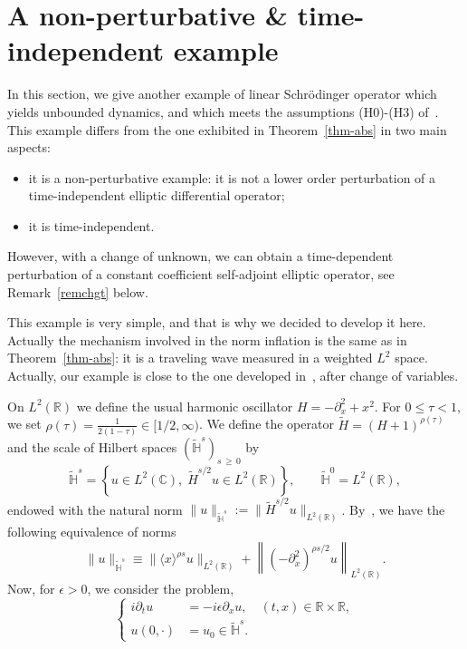 \documentclass[10pt]{amsart}
\theoremstyle{definition}\newtheorem{defi}[theo]{Definition}\newtheorem{rema}[theo]{Remark}\newtheorem{exam}[theo]{Example}\newtheorem{exem}[theo]{Example}\newtheorem{nota}[theo]{Notation}
\newcommand{\C}{\mathbb{C}}
\newcommand{\R}{\mathbb{R}}
\newcommand{\HH}{\mathbb{H}}
\newcommand*\eps{\epsilon}
\newcommand{\wt}{\widetilde}
\newcommand{\<}{\langle}
\renewcommand{\>}{\rangle}
\begin{document}
\appendix
\section{A non-perturbative \& time-independent example}\label{appendixA}

In this section, we give another example of linear Schr\"odinger operator which yields unbounded dynamics, and which meets the assumptions (H0)-(H3) of~\cite{MasRo}. This example differs from the one exhibited in Theorem~\ref{thm-abs} in two main aspects:
\begin{itemize}
\item it is a non-perturbative example: it is not a lower order perturbation of a time-independent elliptic differential operator;
\item it is time-independent.
\end{itemize}

However, with a change of unknown, we can obtain a time-dependent perturbation of a constant coefficient self-adjoint elliptic operator, see Remark~\ref{remchgt} below.

This example is very simple, and that is why we decided to develop it here. Actually the mechanism involved in the norm inflation is the same as in Theorem~\ref{thm-abs}: it is a traveling wave measured in a weighted $L^2$ space. Actually, our example is close to the one developed in~\cite[Appendix A]{BGMR2}, after change of variables.


On $L^2(\R)$ we define the usual harmonic oscillator $H=-\partial^2_x +x^2$. For $0\leq \tau <1$, we set $\rho(\tau)=\frac1{2(1-\tau)} \in [1/2,\infty)$. We define the operator $\wt{H}=(H+1)^{\rho(\tau)}$ and the scale of Hilbert spaces $(\widetilde{\HH}^{s})_{s\,\geq\,0}$ by
\[
\widetilde{\HH}^{s} = \left\{ u\in L^2(\C),\; \wt{H}^{s/2}u\in L^2(\R)\right\}, \qquad \widetilde{\HH}^{0} =L^2(\R),
\]
endowed with the natural norm $\|u\|_{\widetilde{\HH}^{s}} := \|
\wt{H}^{s/2}u \|_{L^2(\R)} $. By~\cite[Lemma~2.4]{YajimaZhang2}, we have the following equivalence of norms
\begin{equation}\label{equiv}
\|u\|_{\widetilde{\HH}^{s}} \equiv \|\<x\>^{\rho s}u\|_{L^2(\R)}+\left\|\left(-\partial^2_x\right)^{\rho s/2}u\right\|_{L^2(\R)}.
\end{equation}
Now, for $\eps>0$, we consider the problem,
\begin{equation}\label{partial}
\begin{cases}
i\partial_t u &=-i\eps \partial_x u, \quad (t,x)\in \R\times \R,\\
u(0, \cdot) &= u_0 \in \widetilde{\HH}^{s}.
\end{cases}
\end{equation}
\end{document}
